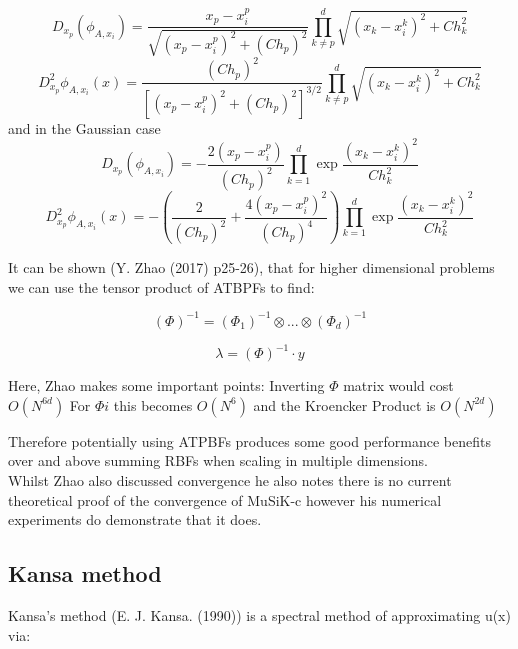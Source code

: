 \documentclass[a4paper]{amsart}
\begin{document}
\begin{equation}
D_{x_{p}}(\phi_{A,x_{i}})=\frac{x_{p}-x^{p}_{i}}{\sqrt{(x_{p}-x^{p}_{i})^{2} + (Ch_{p})^2 }} \prod^{d}_{k\neq p}\sqrt{(x_{k}-x^{k}_{i})^{2}+Ch^{2}_k}
\end{equation}
\begin{equation}
D_{x_{p}}^{2}\phi_{A,x_{i}}(x)=\frac{(Ch_{p})^{2}}{[(x_{p}-x^{p}_{i})^{2} + (Ch_{p})^2 ]^{3/2}} \prod^{d}_{k\neq p}\sqrt{(x_{k}-x^{k}_{i})^{2}+Ch^{2}_k}
\end{equation}
and in the Gaussian case
\begin{equation}
D_{x_{p}}(\phi_{A,x_{i}})= -\frac{2(x_{p}-x^{p}_{i})}{(Ch_{p})^{2}} \prod^{d}_{k=1}\exp{\frac{(x_{k}-x^{k}_{i})^{2}}{ Ch^{2}_k}}
\end{equation}
\begin{equation}
D_{x_{p}}^{2}\phi_{A,x_{i}}(x)= -(\frac{2}{(Ch_{p})^{2}} + \frac{4(x_{p}-x^{p}_{i})^{2}}{(Ch_{p})^{4}}) \prod^{d}_{k=1}\exp{\frac{(x_{k}-x^{k}_{i})^{2}}{ Ch^{2}_k}}
\end{equation}


It can be shown (Y. Zhao (2017) \cite{mski0} p25-26),  that for higher dimensional problems we can use the tensor product of ATBPFs to find:

\begin{equation}
(\Phi)^{-1}=(\Phi_{1})^{-1} \otimes ... \otimes  (\Phi_{d})^{-1}
\end{equation}

\begin{equation}
\lambda = (\Phi)^{-1} \cdot y
\end{equation}

Here, Zhao makes some important points:
Inverting $\Phi$ matrix would cost $O(N^{6d})$
For $\Phi{i}$ this becomes $O(N^{6})$
and the Kroencker Product is $O(N^{2d})$

Therefore potentially using ATPBFs produces some good performance benefits over and above summing RBFs when scaling in multiple dimensions.\\

Whilst Zhao also discussed convergence he also notes there is no current theoretical proof of the convergence of MuSiK-c however his numerical experiments do demonstrate that it does.

\subsection{Kansa method} \label{Kansa}

Kansa's method (E. J. Kansa. (1990)\cite{rbf1}\cite{rbf2}) is a spectral method of approximating u(x) via:
\end{document}

